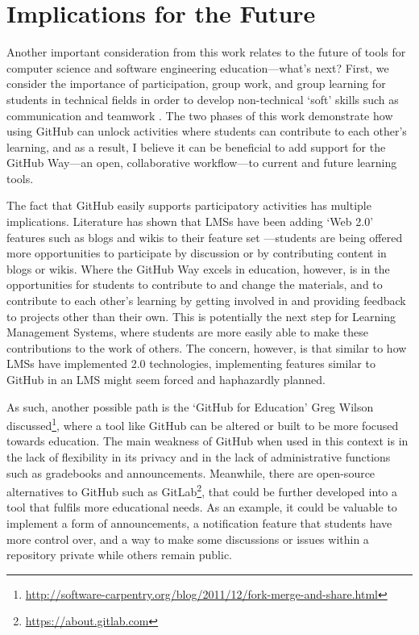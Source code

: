 \section{Implications for the Future}
Another important consideration from this work relates to the future of tools for computer science and software engineering education---what's next? First, we consider the importance of participation, group work, and group learning for students in technical fields in order to develop non-technical `soft' skills such as communication and teamwork \cite{jazayeri2004education}. The two phases of this work demonstrate how using GitHub can unlock activities where students can contribute to each other's learning, and as a result, I believe it can be beneficial to add support for the GitHub Way---an open, collaborative workflow---to current and future learning tools.

The fact that GitHub easily supports participatory activities has multiple implications. Literature has shown that LMSs have been adding `Web 2.0' features such as blogs and wikis to their feature set \cite{downes2005feature}---students are being offered more opportunities to participate by discussion or by contributing content in blogs or wikis. Where the GitHub Way excels in education, however, is in the opportunities for students to contribute to and change the materials, and to contribute to each other's learning by getting involved in and providing feedback to projects other than their own. This is potentially the next step for Learning Management Systems, where students are more easily able to make these contributions to the work of others. The concern, however, is that similar to how LMSs have implemented 2.0 technologies, implementing features similar to GitHub in an LMS might seem forced and haphazardly planned.

As such, another possible path is the `GitHub for Education' Greg Wilson discussed\footnote{\url{http://software-carpentry.org/blog/2011/12/fork-merge-and-share.html}}, where a tool like GitHub can be altered or built to be more focused towards education. The main weakness of GitHub when used in this context is in the lack of flexibility in its privacy and in the lack of administrative functions such as gradebooks and announcements. Meanwhile, there are open-source alternatives to GitHub such as GitLab\footnote{\url{https://about.gitlab.com}}, that could be further developed into a tool that fulfils more educational needs. As an example, it could be valuable to implement a form of announcements, a notification feature that students have more control over, and a way to make some discussions or issues within a repository private while others remain public.

